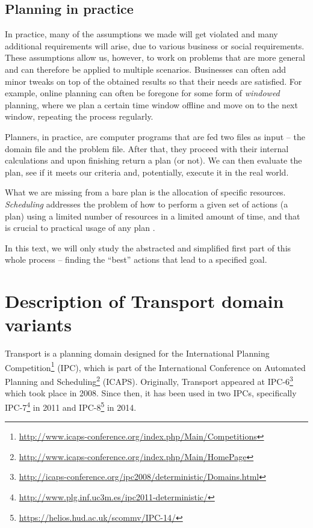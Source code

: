 \subsection{Planning in practice}

In practice, many of the assumptions we made will get violated and many additional requirements will arise,
due to various business or social requirements.
These assumptions allow us, however, to work
on problems that are more general and can therefore be applied to multiple scenarios.
Businesses can often add minor tweaks on top of the obtained results so that
their needs are satisfied. 
For example, online planning can often be foregone for some form of \textit{windowed} planning,
where we plan a certain time window offline and move on to the next window,
repeating the process regularly.

Planners, in practice, are computer programs that are fed two files as input
-- the domain file and the problem file. After that, they proceed with their internal calculations
and upon finishing return a plan (or not). 
We can then evaluate the plan, see if it meets our criteria and, potentially,
execute it in the real world.

What we are missing from a bare plan is the allocation of specific resources.
\textit{Scheduling} addresses the problem of how to perform a given set of actions (a plan)
using a limited number of resources in a limited amount of time, and
that is crucial to practical usage of any plan \citep[Chapter~15]{Ghallab2004}.

In this text, we will only study the abstracted and simplified first part of this whole process
-- finding the ``best'' actions that lead to a specified goal.
















\section{Description of Transport domain variants}

Transport is a planning domain designed for
the International Planning
Competition\footnote{\url{http://www.icaps-conference.org/index.php/Main/Competitions}}
(IPC), which is part of the International Conference on Automated Planning and
Scheduling\footnote{\url{http://www.icaps-conference.org/index.php/Main/HomePage}} (ICAPS).
Originally, Transport appeared at 
IPC-6\footnote{\url{http://icaps-conference.org/ipc2008/deterministic/Domains.html}} which took place in 2008.
Since then, it has been used in two IPCs,
specifically IPC-7\footnote{\url{http://www.plg.inf.uc3m.es/ipc2011-deterministic/}} in 2011
and IPC-8\footnote{\url{https://helios.hud.ac.uk/scommv/IPC-14/}} in 2014.

